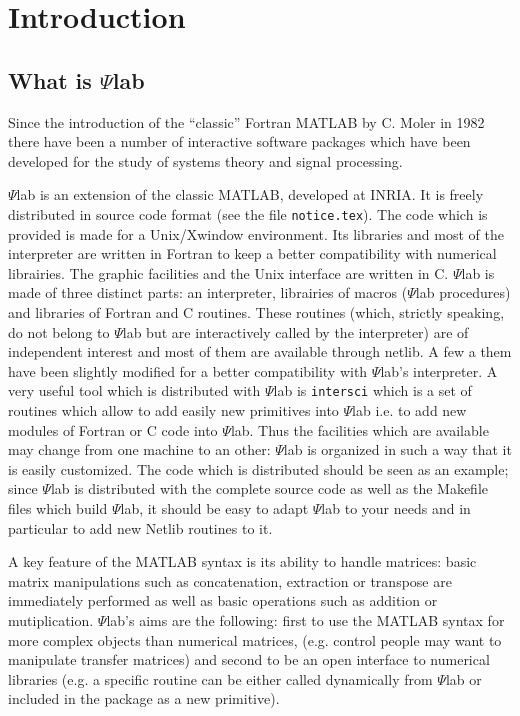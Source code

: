 \chapter{Introduction}

\section{What is $\Psi$lab}

 Since the introduction of the ``classic'' Fortran MATLAB 
by C. Moler in 1982 there have been a number of interactive software 
packages which have been developed for the study of systems theory and 
signal processing.

$\Psi$lab is an extension of the classic MATLAB, developed at INRIA.
It is freely distributed in source code format (see the file {\tt notice.tex}). 
The code which is provided is made for a Unix/Xwindow environment. 
Its libraries and most of the interpreter are written in Fortran to keep 
a better compatibility with numerical librairies. 
The graphic facilities and the Unix interface are written in C. 
$\Psi$lab is made of three distinct parts: an interpreter, 
librairies of macros ($\Psi$lab procedures) and libraries of Fortran 
and C routines. 
These routines (which, strictly speaking, do not belong to $\Psi$lab but
are interactively called by the interpreter) are of 
independent interest and most of them are available through netlib. 
A few a them have been slightly modified for a better compatibility
with $\Psi$lab's interpreter.
A very useful tool which is distributed with $\Psi$lab is {\tt intersci} which
is a set of routines which allow to add easily new primitives into
$\Psi$lab i.e. to add new modules of Fortran or C code into $\Psi$lab.
 Thus the facilities which are available may change from one machine
to an other: $\Psi$lab is organized in such a way that it is easily
customized. The code which is
distributed should be seen as an example; since $\Psi$lab is distributed with
the complete source code as well as the Makefile files which build $\Psi$lab,
it should be easy to adapt $\Psi$lab to your needs and in particular to
add new Netlib routines to it.
 
A key feature of the MATLAB syntax is its ability to handle matrices: 
basic matrix manipulations such as concatenation, 
extraction or transpose are immediately performed as well as basic operations
such as addition or mutiplication. 
$\Psi$lab's aims are the following: first to use the MATLAB syntax 
for more complex objects than numerical matrices,
(e.g. control people may want to manipulate transfer matrices) and
second to be an open interface to numerical libraries (e.g. a specific  
routine can be either called dynamically from $\Psi$lab or included 
in the package as a new primitive). 

